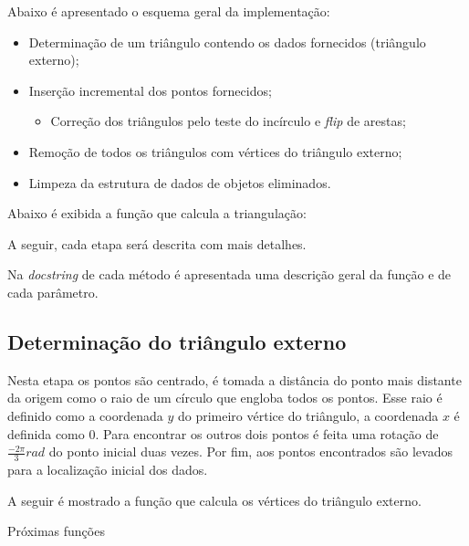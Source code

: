 \documentclass[a4paper]{article}
\begin{document}
Abaixo é apresentado o esquema geral da implementação:
\begin{itemize}
	\item Determinação de um triângulo contendo os dados fornecidos (triângulo externo);
	
	\item Inserção incremental dos pontos fornecidos;
	\begin{itemize}
			\item Correção dos triângulos pelo teste do incírculo e \textit{flip} de arestas;
	\end{itemize}
	
	\item Remoção de todos os triângulos com vértices do triângulo externo;
	
	\item Limpeza da estrutura de dados de objetos eliminados.
	
\end{itemize}

Abaixo é exibida a função que calcula a triangulação:



A seguir, cada etapa será descrita com mais detalhes.

Na \textit{docstring} de cada método é apresentada uma descrição geral da função e de cada parâmetro.

\subsection{Determinação do triângulo externo}

Nesta etapa os pontos são centrado, é tomada a distância do ponto mais distante da origem como o raio de um círculo que engloba todos os pontos. Esse raio é definido como a coordenada $y$ do primeiro vértice do triângulo, a coordenada $x$ é definida como $0$. Para encontrar os outros dois pontos é feita uma rotação de $\frac{-2\pi}{3} rad$ do ponto inicial duas vezes. Por fim, aos pontos encontrados são levados para a localização inicial dos dados.

A seguir é mostrado a função que calcula os vértices do triângulo externo.


Próximas funções

\end{document}
